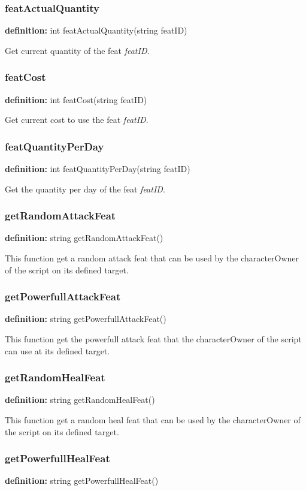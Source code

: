 \documentclass[ letterpaper,12pt]{article}
\begin{document}
\subsubsection{featActualQuantity}
{\bf definition:} int featActualQuantity(string featID)

Get current quantity of the feat {\it featID}.

\subsubsection{featCost}
{\bf definition:} int featCost(string featID)

Get current cost to use the feat {\it featID}.

\subsubsection{featQuantityPerDay}
{\bf definition:} int featQuantityPerDay(string featID)

Get the quantity per day of the feat {\it featID}.

\subsubsection{getRandomAttackFeat}
{\bf definition:} string getRandomAttackFeat()

This function get a random attack feat that can be used by
the characterOwner of the script on its defined target.

\subsubsection{getPowerfullAttackFeat}
{\bf definition:} string getPowerfullAttackFeat()

This function get the powerfull attack feat that the characterOwner
of the script can use at its defined target.

\subsubsection{getRandomHealFeat}
{\bf definition:} string getRandomHealFeat()

This function get a random heal feat that can be used by
the characterOwner of the script on its defined target.

\subsubsection{getPowerfullHealFeat}
{\bf definition:} string getPowerfullHealFeat()
\end{document}
